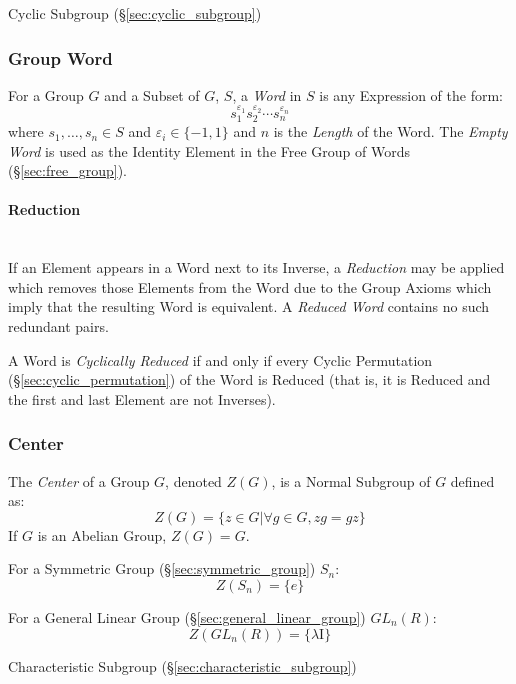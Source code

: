 Cyclic Subgroup (\S\ref{sec:cyclic_subgroup})



\subsubsection{Group Word}\label{sec:group_word}

For a Group $G$ and a Subset of $G$, $S$, a \emph{Word} in $S$ is any
Expression of the form:
\[
    s_1^{\varepsilon_1}s_2^{\varepsilon_2} \cdots s_n^{\varepsilon_n}
\]
where $s_1,\ldots,s_n \in S$ and $\varepsilon_i \in \{-1, 1\}$ and $n$
is the \emph{Length} of the Word. The \emph{Empty Word} is used as the
Identity Element in the Free Group of Words (\S\ref{sec:free_group}).



\paragraph{Reduction}\label{sec:word_reduction}
\hfill \\

If an Element appears in a Word next to its Inverse, a
\emph{Reduction} may be applied which removes those Elements from the
Word due to the Group Axioms which imply that the resulting Word is
equivalent. A \emph{Reduced Word} contains no such redundant pairs.

A Word is \emph{Cyclically Reduced} if and only if every Cyclic
Permutation (\S\ref{sec:cyclic_permutation}) of the Word is Reduced
(that is, it is Reduced and the first and last Element are not
Inverses).



\subsubsection{Center}\label{sec:group_center}

The \emph{Center} of a Group $G$, denoted $Z(G)$, is a Normal Subgroup
of $G$ defined as:
\[
    Z(G) = \{ z \in G | \forall g \in G, zg = gz \}
\]
If $G$ is an Abelian Group, $Z(G) = G$.

For a Symmetric Group (\S\ref{sec:symmetric_group}) $S_n$:
\[
    Z(S_n) = \{e\}
\]

For a General Linear Group (\S\ref{sec:general_linear_group})
$GL_n(R)$:
\[
    Z(GL_n(R)) = \{\lambda \mathrm{I}\}
\]

Characteristic Subgroup (\S\ref{sec:characteristic_subgroup})



